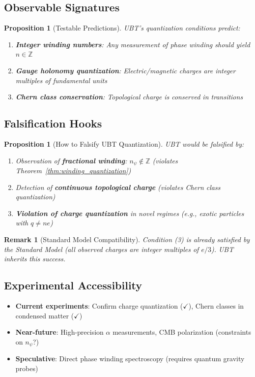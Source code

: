 \documentclass[12pt]{article}
\newtheorem{proposition}[definition]{Proposition}
\newtheorem{remark}[definition]{Remark}
\newcommand{\Z}{\mathbb{Z}}
\begin{document}
\subsection{Observable Signatures}

\begin{proposition}[Testable Predictions]
UBT's quantization conditions predict:
\begin{enumerate}
    \item \textbf{Integer winding numbers}: Any measurement of phase winding should yield $n \in \Z$
    \item \textbf{Gauge holonomy quantization}: Electric/magnetic charges are integer multiples of fundamental units
    \item \textbf{Chern class conservation}: Topological charge is conserved in transitions
\end{enumerate}
\end{proposition}

\subsection{Falsification Hooks}

\begin{proposition}[How to Falsify UBT Quantization]
UBT would be falsified by:
\begin{enumerate}
    \item Observation of \textbf{fractional winding}: $n_\psi \notin \Z$ (violates Theorem~\ref{thm:winding_quantization})
    \item Detection of \textbf{continuous topological charge} (violates Chern class quantization)
    \item \textbf{Violation of charge quantization} in novel regimes (e.g., exotic particles with $q \neq ne$)
\end{enumerate}
\end{proposition}

\begin{remark}[Standard Model Compatibility]
Condition (3) is already satisfied by the Standard Model (all observed charges are integer multiples of $e/3$). UBT inherits this success.
\end{remark}

\subsection{Experimental Accessibility}

\begin{itemize}
    \item \textbf{Current experiments}: Confirm charge quantization ($\checkmark$), Chern classes in condensed matter ($\checkmark$)
    \item \textbf{Near-future}: High-precision $\alpha$ measurements, CMB polarization (constraints on $n_\psi$?)
    \item \textbf{Speculative}: Direct phase winding spectroscopy (requires quantum gravity probes)
\end{itemize}
\end{document}

